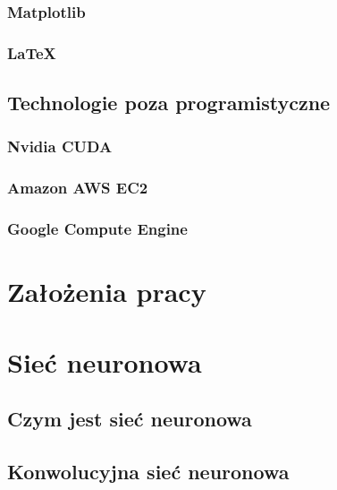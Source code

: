 \documentclass[a4paper,oneside,12pt]{report}
\begin{document}
\subsection {Matplotlib}

\subsection {LaTeX}

\section {Technologie poza programistyczne}

\subsection{Nvidia CUDA}

\subsection {Amazon AWS EC2}

\subsection {Google Compute Engine}


\chapter {Założenia pracy}


\chapter {Sieć neuronowa}

\section {Czym jest sieć neuronowa}

\section {Konwolucyjna sieć neuronowa}
\end{document}
